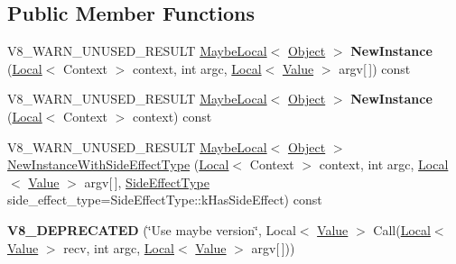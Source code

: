 \subsection*{Public Member Functions}
\begin{DoxyCompactItemize}
\item 
\mbox{\label{classv8_1_1Function_ade57f07a67ad99630573b1c5b905a579}} 
V8\+\_\+\+W\+A\+R\+N\+\_\+\+U\+N\+U\+S\+E\+D\+\_\+\+R\+E\+S\+U\+LT \mbox{\hyperlink{classv8_1_1MaybeLocal}{Maybe\+Local}}$<$ \mbox{\hyperlink{classv8_1_1Object}{Object}} $>$ {\bfseries New\+Instance} (\mbox{\hyperlink{classv8_1_1Local}{Local}}$<$ Context $>$ context, int argc, \mbox{\hyperlink{classv8_1_1Local}{Local}}$<$ \mbox{\hyperlink{classv8_1_1Value}{Value}} $>$ argv\mbox{[}$\,$\mbox{]}) const
\item 
\mbox{\label{classv8_1_1Function_ab491afc6bdf1d5174fe55d5cfad4ffe9}} 
V8\+\_\+\+W\+A\+R\+N\+\_\+\+U\+N\+U\+S\+E\+D\+\_\+\+R\+E\+S\+U\+LT \mbox{\hyperlink{classv8_1_1MaybeLocal}{Maybe\+Local}}$<$ \mbox{\hyperlink{classv8_1_1Object}{Object}} $>$ {\bfseries New\+Instance} (\mbox{\hyperlink{classv8_1_1Local}{Local}}$<$ Context $>$ context) const
\item 
V8\+\_\+\+W\+A\+R\+N\+\_\+\+U\+N\+U\+S\+E\+D\+\_\+\+R\+E\+S\+U\+LT \mbox{\hyperlink{classv8_1_1MaybeLocal}{Maybe\+Local}}$<$ \mbox{\hyperlink{classv8_1_1Object}{Object}} $>$ \mbox{\hyperlink{classv8_1_1Function_a3563e1a0f7de54f2d493a93a4e5e3b69}{New\+Instance\+With\+Side\+Effect\+Type}} (\mbox{\hyperlink{classv8_1_1Local}{Local}}$<$ Context $>$ context, int argc, \mbox{\hyperlink{classv8_1_1Local}{Local}}$<$ \mbox{\hyperlink{classv8_1_1Value}{Value}} $>$ argv\mbox{[}$\,$\mbox{]}, \mbox{\hyperlink{namespacev8_a29711319c2b9fc7716d65faee2f7b9cb}{Side\+Effect\+Type}} side\+\_\+effect\+\_\+type=Side\+Effect\+Type\+::k\+Has\+Side\+Effect) const
\item 
\mbox{\label{classv8_1_1Function_a8d450b17b9bb911860ecf6c51ad468c0}} 
{\bfseries V8\+\_\+\+D\+E\+P\+R\+E\+C\+A\+T\+ED} (\char`\"{}Use maybe version\char`\"{}, Local$<$ \mbox{\hyperlink{classv8_1_1Value}{Value}} $>$ Call(\mbox{\hyperlink{classv8_1_1Local}{Local}}$<$ \mbox{\hyperlink{classv8_1_1Value}{Value}} $>$ recv, int argc, \mbox{\hyperlink{classv8_1_1Local}{Local}}$<$ \mbox{\hyperlink{classv8_1_1Value}{Value}} $>$ argv\mbox{[}$\,$\mbox{]}))
\item 

\end{DoxyCompactItemize}
